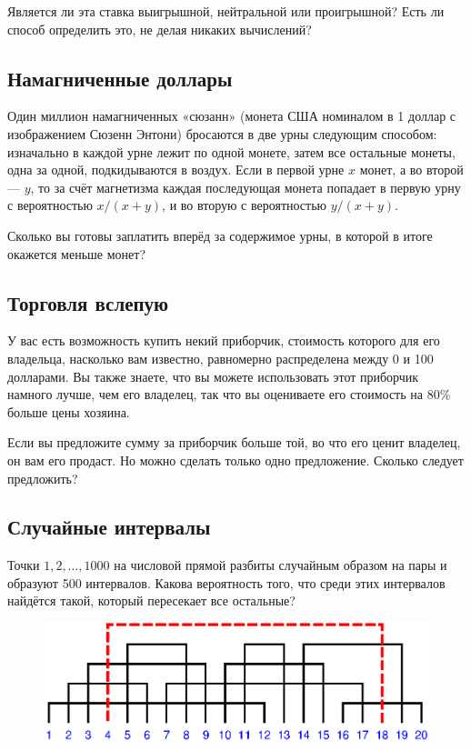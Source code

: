 \medskip

Является ли эта ставка выигрышной, нейтральной или проигрышной? Есть ли способ определить это, не делая никаких вычислений?

\subsection*{Намагниченные доллары}%

Один миллион намагниченных «сюзанн» (монета США номиналом в 1 доллар с изображением Сюзенн Энтони) бросаются в две урны следующим способом: изначально в каждой урне лежит по одной монете, затем все остальные монеты, одна за одной, подкидываются в воздух.
Если в первой урне $x$ монет, а во второй --- $y$, то за счёт магнетизма каждая последующая монета попадает в первую урну с вероятностью $x/(x+y)$, и во вторую с вероятностью $y/(x+y)$.

Сколько вы готовы заплатить вперёд за содержимое урны, в которой в итоге окажется меньше монет?

\subsection*{Торговля вслепую}%

У вас есть возможность купить некий приборчик, стоимость которого для его владельца, насколько вам известно, равномерно распределена между 0 и 100 долларами.
Вы также знаете, что вы можете использовать этот приборчик намного лучше, чем его владелец, так что вы оцениваете его стоимость на $80\%$ больше цены хозяина.

\medskip

Если вы предложите сумму за приборчик больше той, во что его ценит владелец, он вам его продаст.
Но можно сделать только одно предложение.
Сколько следует предложить?

\subsection*{Случайные интервалы}%

Точки $1, 2,\dots, 1000$ на числовой прямой разбиты случайным образом на пары и образуют 500 интервалов.
Какова вероятность того, что среди этих интервалов найдётся такой, который пересекает все остальные?

\begin{figure}[h!]
\centering
\includegraphics[scale=0.8]{Figs/Probability/ints}
\end{figure}
